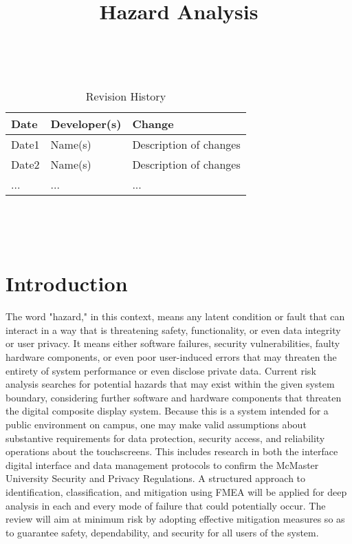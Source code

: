 \documentclass{article}
\title{Hazard Analysis\\\progname}
\author{\authname}
\date{}
\begin{document}
\maketitle
\thispagestyle{empty}

~\newpage


\begin{table}[hp]
\caption{Revision History} \label{TblRevisionHistory}
\begin{tabularx}{\textwidth}{llX}
\toprule
\textbf{Date} & \textbf{Developer(s)} & \textbf{Change}\\
\midrule
Date1 & Name(s) & Description of changes\\
Date2 & Name(s) & Description of changes\\
... & ... & ...\\
\bottomrule
\end{tabularx}
\end{table}

~\newpage

\tableofcontents

~\newpage



\section{Introduction}

The word "hazard," in this context, means any latent condition or fault that can interact in a way
that is threatening safety, functionality, or even data integrity or user privacy. It means either
software failures, security vulnerabilities, faulty hardware components, or even poor user-induced
errors that may threaten the entirety of system performance or even disclose private data.
\newline
\newline
Current risk analysis searches for potential hazards that may exist within the given system
boundary, considering further software and hardware components that threaten the digital composite display system. Because this is a system intended for a public environment on campus, one may make valid assumptions about substantive requirements for data protection, security
access, and reliability operations about the touchscreens. This includes research in both the
interface digital interface and data management protocols to confirm the McMaster University
Security and Privacy Regulations.
\newline
\newline
A structured approach to identification, classification, and mitigation using FMEA will be applied
for deep analysis in each and every mode of failure that could potentially occur. The review will
aim at minimum risk by adopting effective mitigation measures so as to guarantee safety,
dependability, and security for all users of the system.
\end{document}
